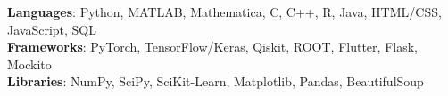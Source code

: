    \begin{itemize}[leftmargin=0.15in, label={}] 
    \small{\item{
      \textbf{Languages}: Python, MATLAB, Mathematica, C, C++, R, Java, HTML/CSS, JavaScript, SQL\\
      \textbf{Frameworks}: PyTorch, TensorFlow/Keras, Qiskit, ROOT, Flutter, Flask, Mockito\\
      \textbf{Libraries}: NumPy, SciPy, SciKit-Learn, Matplotlib, Pandas, BeautifulSoup
       }}
\end{itemize}